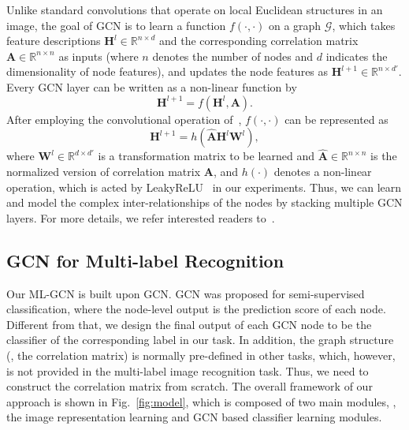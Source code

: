 \documentclass[10pt,twocolumn,letterpaper]{article}
\begin{document}
Unlike standard convolutions that operate on local Euclidean structures in an image, the goal of GCN is to learn a function $f(\cdot,\cdot)$ on a graph $\mathcal{G}$, which takes feature descriptions $\bm{H}^{l}\in\mathbb{R}^{n\times{d}}$ and the corresponding correlation matrix $\bm{A} \in \mathbb{R}^{n \times n}$ as inputs (where $n$ denotes the number of nodes and $d$ indicates the dimensionality of node features), 
and updates the node features as $\bm{H}^{l+1} \in \mathbb{R}^{n \times d'}$. Every GCN layer can be written as a non-linear function by
\begin{equation}
	\bm{H}^{l+1} = f(\bm{H}^{l}, \bm{A}).
\end{equation}
After employing the convolutional operation of~\cite{gcn},  $f(\cdot,\cdot)$ can be represented as
\begin{equation}
\label{eq:gcn}
	\bm{H}^{l+1} = h(\bm{\widehat{A}} \bm{H}^{l} \bm{W}^{l}),
\end{equation}
where $\bm{W}^{l} \in \mathbb{R}^{d \times d'}$ is a transformation matrix to be learned and $\bm{\widehat{A}}\in\mathbb{R}^{n\times{n}}$ is the normalized version of correlation matrix $\bm{A}$, and $h(\cdot)$ denotes a non-linear operation, which is acted by LeakyReLU~\cite{leakyrelu} in our experiments. Thus, we can learn and model the complex inter-relationships of the nodes by stacking multiple GCN layers. For more details, we refer interested readers to~\cite{gcn}.

\subsection{GCN for Multi-label Recognition}

Our ML-GCN is built upon GCN. GCN was proposed for semi-supervised classification, where the node-level output is the prediction score of each node. Different from that, we design the final output of each GCN node to be the classifier of the corresponding label in our task. In addition, the graph structure (\ie, the correlation matrix) is normally pre-defined in other tasks, which, however, is not provided in the multi-label image recognition task. Thus, we need to construct the correlation matrix from scratch. The overall framework of our approach is shown in Fig.~\ref{fig:model}, which is composed of two main modules, \ie, the image representation learning and GCN based classifier learning modules.
\end{document}
